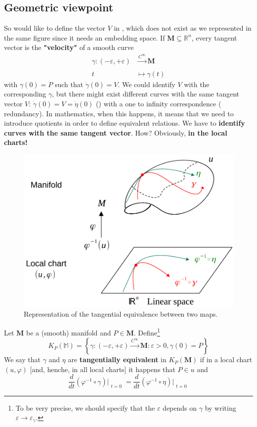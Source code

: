 \documentclass[../main.tex]{subfiles}
\begin{document}
\subsection[Geometric viewpoint]{Geometric viewpoint}
So would like to define the vector $V$ in , which does not exist as we represented in the same figure since it needs an embedding space. If $\mathbf{M} \subseteq \mathbb{R}^n$, every tangent vector is the \textbf{"velocity"} of a smooth curve
\[
\begin{split}
\gamma : (-\varepsilon,+\varepsilon)& \xrightarrow[]{C^\infty} \mathbf{M}\\
t &\mapsto \gamma(t)
\end{split}
\] with $\gamma(0)=P$ such that $\Dot{\gamma}(0)=V$. We could identify $V$ with the corresponding $\gamma$, but there might exist different curves with the same tangent vector $V$: $\Dot{\gamma}(0)=V=\Dot{\eta}(0)$ () with a one to infinity correspondence ({\selectfont{}\relax} redundancy). In mathematics, when this happens, it means that we need to introduce quotients in order to define equivalent relations. We have to \textbf{identify curves with the same tangent vector}. How? Obviously, \textbf{in the local charts!} 
\begin{figure}[H]
	\includegraphics{images/tan_equiv.pdf}
	\caption[Tangential equivalence]{Representation of the tangential equivalence between two maps.}
\end{figure} 
\begin{definition}
Let $\mathbf{M}$ be a (smooth) manifold and $P \in \mathbf{M}$. Define\footnote{To be very precise, we should specify that the $\varepsilon$ depends on $\gamma$ by writing $\varepsilon \to \varepsilon_\gamma$.}
\[
K_P(\mathbb{M})=\left\{\gamma:(-\varepsilon,+\varepsilon)\xrightarrow[]{C^\infty}\mathbf{M}:\varepsilon>0, \gamma(0)=P \right\}
\]
We say that $\gamma$ and $\eta$ are \textbf{tangentially equivalent} in $K_P(\mathbf{M})$ if in a local chart $(u,\varphi)$ [and, henche, in all local charts] it happens that $P \in u$ and
\[
\frac{d}{dt}(\varphi^{-1}\circ \gamma)\Bigr|_{\substack{t=0}}=\frac{d}{dt}(\varphi^{-1}\circ \eta)\Bigr|_{\substack{t=0}}
\]
\end{definition}
\end{document}
